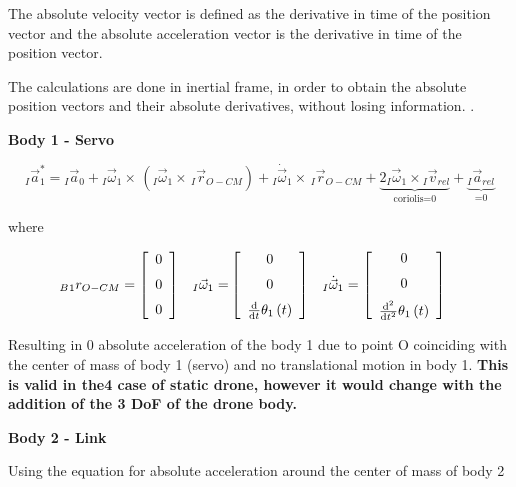 The absolute velocity vector is defined as the derivative in time of the position vector and the absolute acceleration vector is the derivative in time of the position vector.

The calculations are done in inertial frame, in order to obtain the absolute position vectors and their absolute  derivatives, without losing information. \cite{santos2001dinamica}.


\textbf{Body 1 - Servo}

\begin{equation}\label{aabody1}
_I\vec{a}_{1}^* = {_I}\vec{a}_{0}+ {_I}\vec{\omega}_{1}\times \,({_I}\vec{\omega}_{1}\times \,{_I}\vec{r}_{O-CM}) + {_I}\dot{\vec{\omega}}_{1}\times \,{_I}\vec{r}_{O-CM} + \underbrace{2{_I}\vec{\omega}_{1} \times {_I}\vec{v}_{rel}}_\text{coriolis=0} +  \underbrace{{_I}\vec{a}_{rel}}_\text{=0}
\end{equation}

 where 
 
 \begin{align*}
_B{_1}{r}_{O-CM} &= \left[ \begin {array}{c} 0\\ \noalign{\medskip}0\\ \noalign{\medskip}0
\end {array} \right] &
{_I}\vec{\omega}_{1} =&  \left[ \begin {array}{c} 0\\ \noalign{\medskip}0\\ \noalign{\medskip}
{\frac {\rm d}{{\rm d}t}}\theta_{{1}} \left( t \right) \end {array}
 \right]&
{_I}\dot{\vec{\omega}}_{1} &= \left[ \begin {array}{c} 0\\ \noalign{\medskip}0\\ \noalign{\medskip}
{\frac {{\rm d}^{2}}{{\rm d}{t}^{2}}}\theta_{{1}} \left( t \right) 
\end {array} \right] &
\end{align*}
 
 Resulting in 0 absolute acceleration of the body 1 due to point O coinciding with the center of mass of body 1 (servo) and no translational motion in body 1.  \textbf{This is valid in the4 case of static drone, however it would change with the addition of the 3 DoF of the drone body. }
 
 
\textbf{Body 2 - Link}
 
 Using the equation for absolute acceleration around the center of mass of body 2
 
